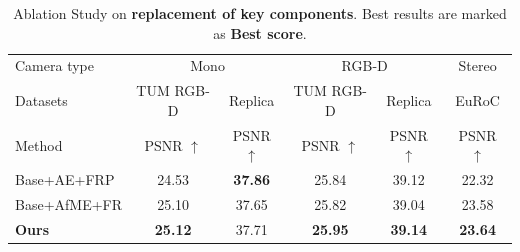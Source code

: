 \begin{table}
\scriptsize
  \centering
   \setlength\tabcolsep{3.5pt} 
  \begin{tabular}{@{}l|cc|cc|c} %
    \hline  
   Camera type & \multicolumn{2}{c|}{Mono} & \multicolumn{2}{c|}{RGB-D} & Stereo\\
   Datasets & TUM RGB-D & Replica & TUM RGB-D & Replica & EuRoC \\
   Method &  PSNR $\uparrow$ &  PSNR $\uparrow$  &  PSNR $\uparrow$ &  PSNR $\uparrow$  &  PSNR $\uparrow$  \\
    \hline         
       Base+AE+FRP  & 24.53 & {\bf 37.86} & 25.84 & 39.12 &	22.32 \\
       Base+AfME+FR & 25.10 & 37.65 & 25.82 &  39.04 &	23.58  \\
       \hline
       {\bf Ours}  & {\bf 25.12} &  37.71 & {\bf 25.95} & {\bf 39.14} &	 {\bf 23.64} \\
    \hline
  \end{tabular}
  \caption{ Ablation Study on {\bf replacement of key components}. Best results are marked as {\bf Best score}.}
  \label{tab:ablation2}
\end{table}

